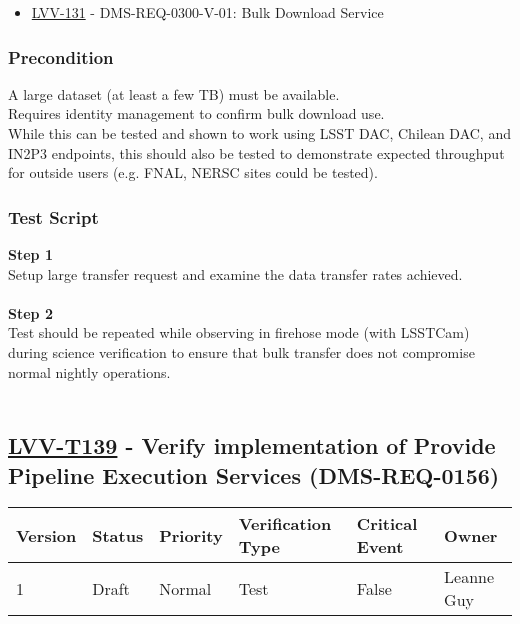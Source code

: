 \begin{itemize}
\tightlist
\item
  \href{https://jira.lsstcorp.org/browse/LVV-131}{LVV-131} -
  DMS-REQ-0300-V-01: Bulk Download Service
\end{itemize}

\hypertarget{precondition-11}{%
\subsubsection{Precondition}\label{precondition-11}}

A large dataset (at least a few TB) must be available.\\
Requires identity management to confirm bulk download use.\\
While this can be tested and shown to work using LSST DAC, Chilean DAC,
and IN2P3 endpoints, this should also be tested to demonstrate expected
throughput for outside users (e.g. FNAL, NERSC sites could be tested).

\hypertarget{test-script-115}{%
\subsubsection{Test Script}\label{test-script-115}}

\textbf{Step 1}\\
Setup large transfer request and examine the data transfer rates
achieved.\\
~\\
\textbf{Step 2}\\
Test should be repeated while observing in firehose mode (with LSSTCam)
during science verification to ensure that bulk transfer does not
compromise normal nightly operations.\\
~\\

\hypertarget{lvv-t139---verify-implementation-of-provide-pipeline-execution-services-dms-req-0156}{%
\subsection{\texorpdfstring{\href{https://jira.lsstcorp.org/secure/Tests.jspa\#/testCase/LVV-T139}{LVV-T139}
- Verify implementation of Provide Pipeline Execution Services
(DMS-REQ-0156)}{LVV-T139 - Verify implementation of Provide Pipeline Execution Services (DMS-REQ-0156)}}\label{lvv-t139---verify-implementation-of-provide-pipeline-execution-services-dms-req-0156}}

\begin{longtable}[]{@{}llllll@{}}
\toprule
Version & Status & Priority & Verification Type & Critical Event &
Owner\tabularnewline
\midrule
\endhead
1 & Draft & Normal & Test & False & Leanne Guy\tabularnewline
\bottomrule
\end{longtable}

